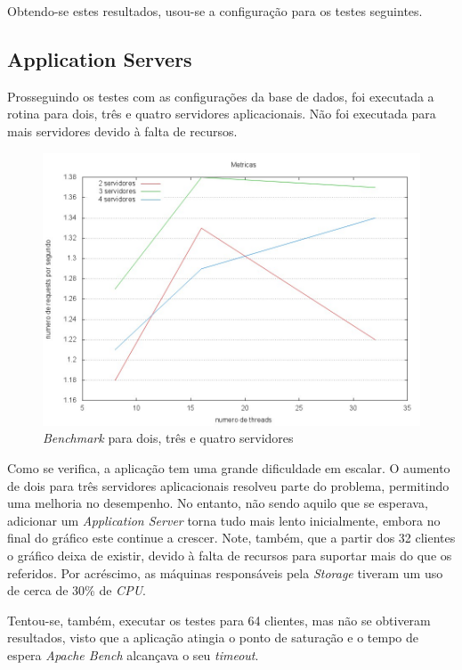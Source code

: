 Obtendo-se estes resultados, usou-se a configuração para os testes seguintes.

\subsection{Application Servers}

Prosseguindo os testes com as configurações da base de dados, foi executada a rotina para dois, três e quatro servidores aplicacionais. Não foi executada para mais servidores devido à falta de recursos.

\begin{figure}[ht]
\centerline{\includegraphics[width=1\textwidth]{images/benchmark/servers}}
\caption{\emph{Benchmark} para dois, três e quatro servidores}
\end{figure}


Como se verifica, a aplicação tem uma grande dificuldade em escalar. O aumento de dois para três servidores aplicacionais resolveu parte do problema, permitindo uma melhoria no desempenho. No entanto, não sendo aquilo que se esperava, adicionar um \emph{Application Server} torna tudo mais lento inicialmente, embora no final do gráfico este continue a crescer. Note, também, que a partir dos 32 clientes o gráfico deixa de existir, devido à falta de recursos para suportar mais do que os referidos. Por acréscimo, as máquinas responsáveis pela \emph{Storage} tiveram um uso de cerca de 30\% de \emph{CPU}.

Tentou-se, também, executar os testes para 64 clientes, mas não se obtiveram resultados, visto que a aplicação atingia o ponto de saturação e o tempo de espera \emph{Apache Bench} alcançava o seu \emph{timeout}.
